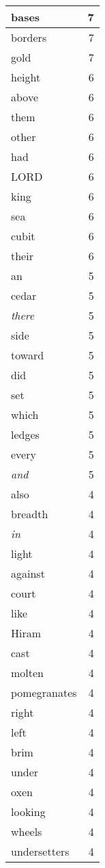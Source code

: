 \begin{center}
\begin{longtable}{l|r}
bases & 7 \\ \hline
borders & 7 \\ \hline
gold & 7 \\ \hline
height & 6 \\ \hline
above & 6 \\ \hline
them & 6 \\ \hline
other & 6 \\ \hline
had & 6 \\ \hline
LORD & 6 \\ \hline
king & 6 \\ \hline
sea & 6 \\ \hline
cubit & 6 \\ \hline
their & 6 \\ \hline
an & 5 \\ \hline
cedar & 5 \\ \hline
\emph{there} & 5 \\ \hline
side & 5 \\ \hline
toward & 5 \\ \hline
did & 5 \\ \hline
set & 5 \\ \hline
which & 5 \\ \hline
ledges & 5 \\ \hline
every & 5 \\ \hline
\emph{and} & 5 \\ \hline
also & 4 \\ \hline
breadth & 4 \\ \hline
\emph{in} & 4 \\ \hline
light & 4 \\ \hline
against & 4 \\ \hline
court & 4 \\ \hline
like & 4 \\ \hline
Hiram & 4 \\ \hline
cast & 4 \\ \hline
molten & 4 \\ \hline
pomegranates & 4 \\ \hline
right & 4 \\ \hline
left & 4 \\ \hline
brim & 4 \\ \hline
under & 4 \\ \hline
oxen & 4 \\ \hline
looking & 4 \\ \hline
wheels & 4 \\ \hline
undersetters & 4 \\ \hline

\end{longtable}
\end{center}
